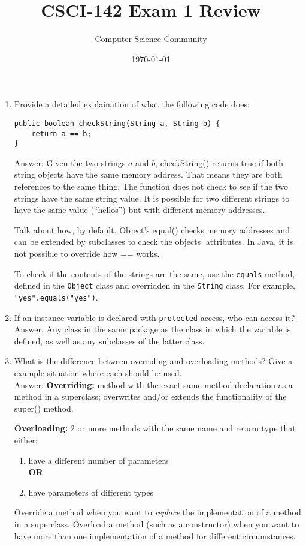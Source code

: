\documentclass[11pt]{article}
\title{CSCI-142 Exam 1 Review}
\author{Computer Science Community}
\date{\today}
\newenvironment{answer}{\large\lstset{basicstyle=\tiny\ttfamily}\color{white} \small{Answer:}}{}
\newenvironment{answer}{\large\lstset{basicstyle=\large\ttfamily}\color{red} \small{Answer:}}{}
\begin{document}
\header
\begin{enumerate}


\item Provide a detailed explaination of what the following code does:
\begin{lstlisting}
public boolean checkString(String a, String b) {
	return a == b;
}
\end{lstlisting}
\begin{answer}
Given the two strings $a$ and $b$, checkString() returns true if both string objects have the same memory address.  That means they are both references to the same thing.  The function does not check to see if the two strings have the same string value.  It is possible for two different strings to have the same value (``hellos'') but with different memory addresses.  

Talk about how, by default, Object's equal() checks memory addresses and can be extended by subclasses to check the objects' attributes.  In Java, it is not possible to override how == works.

To check if the contents of the strings are the same, use the {\tt equals} method, defined in the {\tt Object} class and overridden in the {\tt String} class.
For example, {\tt "yes".equals("yes")}.
\end{answer}

\item If an instance variable is declared with {\tt protected} access, who can access it? \\
\begin{answer}
Any class in the same package as the class in which the variable is defined, as well as any subclasses of the latter class.
\end{answer}


\item What is the difference between overriding and overloading methods?  Give a example situation where each should be used. \\
\begin{answer}
\textbf{Overriding:} method with the exact same method declaration as a method in a superclass; overwrites and/or extends the functionality of the super() method.

\textbf{Overloading:} 2 or more methods with the same name and return type that either:
	\begin{enumerate}
	\item have a different number of parameters\\ \textbf{OR}
	\item have parameters of different types
	\end{enumerate}
Override a method when you want to \textit{replace} the implementation of a method in a superclass.  Overload a method (such as a constructor) when you want to have more than one implementation of a method for different circumstances.
\end{answer}



\end{enumerate}
\end{document}
